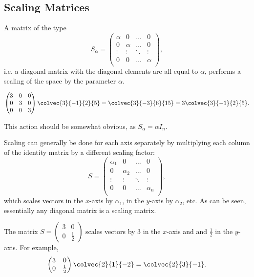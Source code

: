 \subsection{Scaling Matrices}
A matrix of the type
\begin{equation*}
  S_{\alpha} = \begin{pmatrix}
				 \alpha & 0 & \dots & 0\\
				 0 & \alpha & \dots & 0\\
				 \vdots & \vdots & \ddots & \vdots\\
				 0 & 0 & \dots & \alpha\\
			   \end{pmatrix},
\end{equation*}
i.e. a diagonal matrix with the diagonal elements are all equal to $\alpha$, performs a scaling of the space by the parameter $\alpha$.
\begin{example}
  \begin{equation*}
	\begin{pmatrix}
	  3 & 0 & 0\\
	  0 & 3 & 0\\
	  0 & 0 & 3
	\end{pmatrix}\colvec{3}{-1}{2}{5} = \colvec{3}{-3}{6}{15} = 3\colvec{3}{-1}{2}{5}.
  \end{equation*}
\end{example}
This action should be somewhat obvious, as $S_{\alpha}=\alpha I_{n}$.

Scaling can generally be done for each axis separately by multiplying each column of the identity matrix by a different scaling factor:
\begin{equation*}
  S = \begin{pmatrix}
		\alpha_{1} & 0 & \dots & 0\\
		0 & \alpha_{2} & \dots & 0\\
		\vdots & \vdots & \ddots & \vdots\\
		0 & 0 & \dots & \alpha_{n}\\
	  \end{pmatrix},
\end{equation*}
which scales vectors in the $x$-axis by $\alpha_{1}$, in the $y$-axis by $\alpha_{2}$, etc. As can be seen, essentially any diagonal matrix is a scaling matrix.
\begin{example}
  The matrix $S = \begin{pmatrix} 3 & 0 \\ 0 & \frac{1}{2} \end{pmatrix}$ scales vectors by $3$ in the $x$-axis and and $\frac{1}{2}$ in the $y$-axis. For example,
  \begin{equation*}
	\begin{pmatrix} 3 & 0 \\ 0 & \frac{1}{2} \end{pmatrix}\colvec{2}{1}{-2} = \colvec{2}{3}{-1}.
  \end{equation*}
\end{example}

